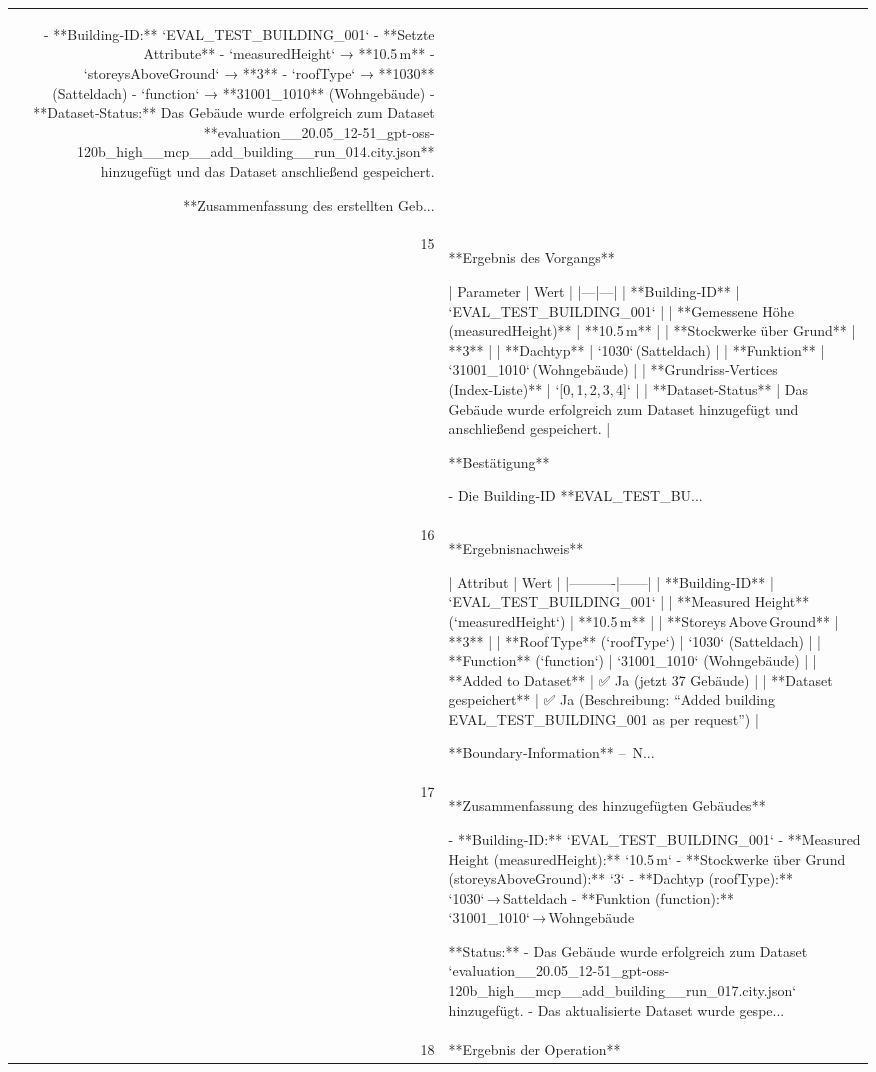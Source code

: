 \documentclass[a4paper,11pt]{article}
\begin{document}
\begin{table}[ht]
\begin{tabular}{r p{12cm}}
- **Building‑ID:** `EVAL\_TEST\_BUILDING\_001`  
- **Setzte Attribute**  
  - `measuredHeight` → **10.5 m**  
  - `storeysAboveGround` → **3**  
  - `roofType` → **1030** (Satteldach)  
  - `function` → **31001\_1010** (Wohngebäude)  
- **Dataset‑Status:** Das Gebäude wurde erfolgreich zum Dataset **evaluation\_\_20.05\_12-51\_gpt-oss-120b\_high\_\_mcp\_\_add\_building\_\_run\_014.city.json** hinzugefügt und das Dataset anschließend gespeichert.  

**Zusammenfassung des erstellten Geb... \\
15 & **Ergebnis des Vorgangs**

| Parameter | Wert |
|---|---|
| **Building‑ID** | `EVAL\_TEST\_BUILDING\_001` |
| **Gemessene Höhe (measuredHeight)** | **10.5 m** |
| **Stockwerke über Grund** | **3** |
| **Dachtyp** | `1030` (Satteldach) |
| **Funktion** | `31001\_1010` (Wohngebäude) |
| **Grundriss‑Vertices (Index‑Liste)** | `[0, 1, 2, 3, 4]` |
| **Dataset‑Status** | Das Gebäude wurde erfolgreich zum Dataset hinzugefügt und anschließend gespeichert. |

**Bestätigung**

- Die Building‑ID **EVAL\_TEST\_BU... \\
16 & **Ergebnisnachweis**

| Attribut | Wert |
|----------|------|
| **Building‑ID** | `EVAL\_TEST\_BUILDING\_001` |
| **Measured Height** (`measuredHeight`) | **10.5 m** |
| **Storeys Above Ground** | **3** |
| **Roof Type** (`roofType`) | `1030` (Satteldach) |
| **Function** (`function`) | `31001\_1010` (Wohngebäude) |
| **Added to Dataset** | ✅ Ja (jetzt 37 Gebäude) |
| **Dataset gespeichert** | ✅ Ja (Beschreibung: “Added building EVAL\_TEST\_BUILDING\_001 as per request”) |

**Boundary‑Information** – N... \\
17 & **Zusammenfassung des hinzugefügten Gebäudes**

- **Building-ID:** `EVAL\_TEST\_BUILDING\_001`  
- **Measured Height (measuredHeight):** `10.5 m`  
- **Stockwerke über Grund (storeysAboveGround):** `3`  
- **Dachtyp (roofType):** `1030` → Satteldach  
- **Funktion (function):** `31001\_1010` → Wohngebäude  

**Status:**  
- Das Gebäude wurde erfolgreich zum Dataset `evaluation\_\_20.05\_12-51\_gpt-oss-120b\_high\_\_mcp\_\_add\_building\_\_run\_017.city.json` hinzugefügt.  
- Das aktualisierte Dataset wurde gespe... \\
18 & **Ergebnis der Operation**


\end{tabular}
\end{table}
\end{document}
